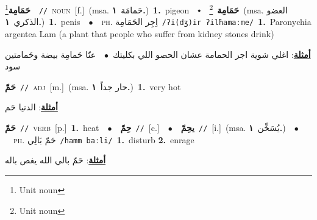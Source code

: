 \documentclass[10pt,a4paper,twoside]{article} %
\begin{document}
\begin{multicols}{2}
{\setlength\topsep{0pt}\textbf{\foreignlanguage{arabic}{حَمَامِة}}\footnote{Unit noun}\ \ {\color{gray}\texttt{//}\color{black}}\ \textsc{noun}\ [f.]\ \color{gray}(msa. \foreignlanguage{arabic}{حَمامَة}~\foreignlanguage{arabic}{\textbf{١.}})\color{black}\ \textbf{1.}~pigeon\ \ $\smblkdiamond$\ \ \setlength\topsep{0pt}\textbf{\foreignlanguage{arabic}{حَمَامِة}}\ \footnote{Unit noun}\ \color{gray}(msa. \foreignlanguage{arabic}{العضو الذكري}~\foreignlanguage{arabic}{\textbf{١.}})\color{black}\ \textbf{1.}~penis\ \ $\bullet$\ \ \textsc{ph.} \color{gray} \foreignlanguage{arabic}{اِجِر الحَمَامِة}\color{black}\ {\color{gray}\texttt{/{\sffamily ʔi(dʒ)ir ʔilħamaːme}/}\color{black}}\ \textbf{1.}~Paronychia argentea Lam (a plant that people who suffer from kidney stones drink)\  \begin{flushright}\color{gray}\foreignlanguage{arabic}{\textbf{\underline{\foreignlanguage{arabic}{أمثلة}}}: اغلي شوية اجر الحمامة عشان الحصو اللي بكليتك\ $\bullet$\ \  عنّا حَمامِة بيضة وحَمامتين سود}\end{flushright}\color{black}} \vspace{2mm}

{\setlength\topsep{0pt}\textbf{\foreignlanguage{arabic}{حَمّ}}\ {\color{gray}\texttt{//}\color{black}}\ \textsc{adj}\ [m.]\ \color{gray}(msa. \foreignlanguage{arabic}{حار جداً}~\foreignlanguage{arabic}{\textbf{١.}})\color{black}\ \textbf{1.}~very hot\  \begin{flushright}\color{gray}\foreignlanguage{arabic}{\textbf{\underline{\foreignlanguage{arabic}{أمثلة}}}: الدنيا حَم}\end{flushright}\color{black}} \vspace{2mm}

{\setlength\topsep{0pt}\textbf{\foreignlanguage{arabic}{حَمّ}}\ {\color{gray}\texttt{//}\color{black}}\ \textsc{verb}\ [p.]\ \textbf{1.}~heat\ \ $\bullet$\ \ \setlength\topsep{0pt}\textbf{\foreignlanguage{arabic}{حِمّ}}\ {\color{gray}\texttt{//}\color{black}}\ [c.]\ \ $\bullet$\ \ \setlength\topsep{0pt}\textbf{\foreignlanguage{arabic}{يحِمّ}}\ {\color{gray}\texttt{//}\color{black}}\ [i.]\ \color{gray}(msa. \foreignlanguage{arabic}{يُسَخِّن}~\foreignlanguage{arabic}{\textbf{١.}})\color{black}\ \ $\bullet$\ \ \textsc{ph.} \color{gray} \foreignlanguage{arabic}{حَمّ بَالِي}\color{black}\ {\color{gray}\texttt{/{\sffamily ħamm baːli}/}\color{black}}\ \textbf{1.}~disturb  \textbf{2.}~enrage\  \begin{flushright}\color{gray}\foreignlanguage{arabic}{\textbf{\underline{\foreignlanguage{arabic}{أمثلة}}}: حَمّ بالي الله يغص باله}\end{flushright}\color{black}} \vspace{2mm}


\end{multicols}
\end{document}
